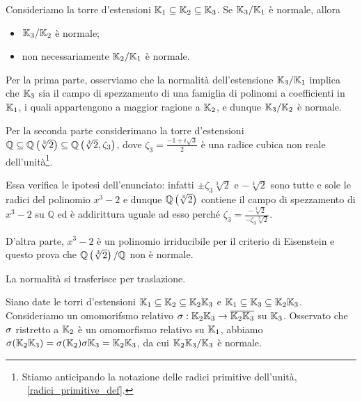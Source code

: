\begin{Theorem}
	Consideriamo la torre d'estensioni $\mathbb{K}_1 \subseteq \mathbb{K}_2 \subseteq \mathbb{K}_3$. Se $\mathbb{K}_3/\mathbb{K}_1$ \`e normale, allora
	\begin{itemize}
		\item $\mathbb{K}_3/\mathbb{K}_2$ \`e normale;
		\item non necessariamente $\mathbb{K}_2/\mathbb{K}_1$ \`e normale.
	\end{itemize}
\end{Theorem}
\Proof Per la prima parte, osserviamo che la normalit\`a dell'estensione $\mathbb{K}_3/\mathbb{K}_1$ implica che $\mathbb{K}_3$ sia il campo di spezzamento di una famiglia di polinomi a coefficienti in $\mathbb{K}_1$, i quali appartengono a maggior ragione a $\mathbb{K}_2$, e dunque $\mathbb{K}_3/\mathbb{K}_2$ \`e normale.
\par Per la seconda parte considerimano la torre d'estensioni $\mathbb{Q} \subseteq \mathbb{Q} \left ( \sqrt[3]{2} \right ) \subseteq \mathbb{Q} \left ( \sqrt[3]{2},\zeta_3 \right )$, dove $\zeta_3 = \frac{- 1 + i\sqrt{3}}{2}$ \`e una radice cubica non reale dell'unit\`a\footnote{Stiamo anticipando la notazione delle radici primitive dell'unit\`a, \Cfr\ \ref{radici_primitive_def}.}.
\par Essa verifica le ipotesi dell'enunciato: infatti $\pm \zeta_3 \sqrt[3]{2}$ e $- \sqrt[3]{2}$ sono tutte e sole le radici del polinomio $x^3 - 2$ e dunque $\mathbb{Q} \left ( \sqrt[3]{2} \right )$ contiene il campo di spezzamento di $x^3 - 2$ su $\mathbb{Q}$ ed \`e addirittura uguale ad esso perch\'e $\zeta_3 = \frac{- \sqrt[3]{2}}{- \zeta_3 \sqrt[3]{2}}$.
\par D'altra parte, $x^3 - 2$ \`e un polinomio irriducibile per il criterio di Eisenstein e questo prova che $\mathbb{Q} \left ( \sqrt[3]{2} \right )/\mathbb{Q}$ non \`e normale. \EndProof
\begin{Theorem}
	La normalit\`a si trasferisce per traslazione.
\end{Theorem}
\Proof Siano date le torri d'estensioni $\mathbb{K}_1 \subseteq \mathbb{K}_2 \subseteq \mathbb{K}_2\mathbb{K}_3$ e $\mathbb{K}_1 \subseteq \mathbb{K}_3 \subseteq \mathbb{K}_2\mathbb{K}_3$. Consideriamo un omomorifsmo relativo $\sigma: \mathbb{K}_2\mathbb{K}_3 \rightarrow \overline{\mathbb{K}_2\mathbb{K}_3}$ su $\mathbb{K}_3$. Osservato che $\sigma$ ristretto a $\mathbb{K}_2$ \`e un omomorfismo relativo su $\mathbb{K}_1$, abbiamo $\sigma(\mathbb{K}_2\mathbb{K}_3) = \sigma(\mathbb{K}_2)\sigma{\mathbb{K}_3} = \mathbb{K}_2\mathbb{K}_3$, da cui $\mathbb{K}_2\mathbb{K}_3/\mathbb{K}_3$ \`e normale. \EndProof
